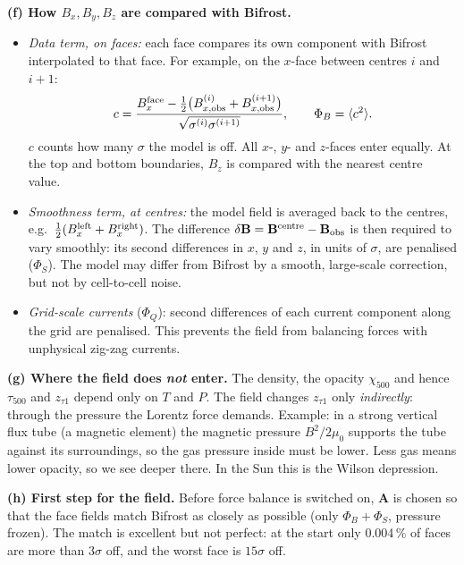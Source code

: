 \documentclass[10pt]{extarticle}
\newcommand{\B}{\mathbf B}\newcommand{\J}{\mathbf J}\newcommand{\Bo}{\mathbf B_{\rm obs}}
\begin{document}
\textbf{(f) How $B_x,B_y,B_z$ are compared with Bifrost.}
\begin{itemize}
\item \emph{Data term, on faces:} each face compares its own component with Bifrost interpolated to that face. For example, on the $x$-face between centres $i$ and $i{+}1$:
\[
c=\frac{B_x^{\rm face}-\tfrac12\big(B^{(i)}_{x,{\rm obs}}+B^{(i+1)}_{x,{\rm obs}}\big)}{\sqrt{\sigma^{(i)}\sigma^{(i+1)}}},\qquad \Phi_B=\langle c^2\rangle .
\]
$c$ counts how many $\sigma$ the model is off. All $x$-, $y$- and $z$-faces enter equally. At the top and bottom boundaries, $B_z$ is compared with the nearest centre value.
\item \emph{Smoothness term, at centres:} the model field is averaged back to the centres, e.g.\ $\tfrac12(B_x^{\rm left}+B_x^{\rm right})$. The difference $\delta\B=\B^{\rm centre}-\Bo$ is then required to vary smoothly: its second differences in $x$, $y$ and $z$, in units of $\sigma$, are penalised ($\Phi_S$). The model may differ from Bifrost by a smooth, large-scale correction, but not by cell-to-cell noise.
\item \emph{Grid-scale currents} ($\Phi_Q$): second differences of each current component along the grid are penalised. This prevents the field from balancing forces with unphysical zig-zag currents.
\end{itemize}

\textbf{(g) Where the field does \emph{not} enter.} The density, the opacity $\chi_{500}$ and hence $\tau_{500}$ and $z_{\tau1}$ depend only on $T$ and $P$. The field changes $z_{\tau1}$ only \emph{indirectly}: through the pressure the Lorentz force demands. Example: in a strong vertical flux tube (a magnetic element) the magnetic pressure $B^2/2\mu_0$ supports the tube against its surroundings, so the gas pressure inside must be lower. Less gas means lower opacity, so we see deeper there. In the Sun this is the Wilson depression.

\textbf{(h) First step for the field.} Before force balance is switched on, $\mathbf A$ is chosen so that the face fields match Bifrost as closely as possible (only $\Phi_B+\Phi_S$, pressure frozen). The match is excellent but not perfect: at the start only 0.004\,\% of faces are more than $3\sigma$ off, and the worst face is $15\sigma$ off.
\end{document}
